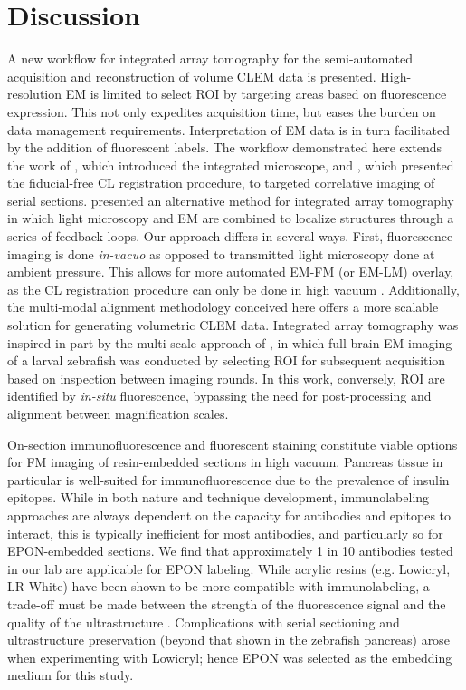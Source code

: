 \section{Discussion}
\label{sec:3.4_discussion}

A new workflow for integrated array tomography for the semi-automated acquisition and reconstruction of volume CLEM data is presented. High-resolution EM is limited to select ROI by targeting areas based on fluorescence expression. This not only expedites acquisition time, but eases the burden on data management requirements. Interpretation of EM data is in turn facilitated by the addition of fluorescent labels. The workflow demonstrated here extends the work of \textcite{liv2013simultaneous}, which introduced the integrated microscope, and \textcite{haring2017automated}, which presented the fiducial-free CL registration procedure, to targeted correlative imaging of serial sections. \textcite{gabarre2021workflow} presented an alternative method for integrated array tomography in which light microscopy and EM are combined to localize structures through a series of feedback loops. Our approach differs in several ways. First, fluorescence imaging is done \textit{in-vacuo} as opposed to transmitted light microscopy done at ambient pressure. This allows for more automated EM-FM (or EM-LM) overlay, as the CL registration procedure can only be done in high vacuum \cite{haring2017automated}. Additionally, the multi-modal alignment methodology conceived here offers a more scalable solution for generating volumetric CLEM data. Integrated array tomography was inspired in part by the multi-scale approach of \textcite{hildebrand2017whole}, in which full brain EM imaging of a larval zebrafish was conducted by selecting ROI for subsequent acquisition based on inspection between imaging rounds. In this work, conversely, ROI are identified by \textit{in-situ} fluorescence, bypassing the need for post-processing and alignment between magnification scales.

On-section immunofluorescence and fluorescent staining constitute viable options for FM imaging of resin-embedded sections in high vacuum. Pancreas tissue in particular is well-suited for immunofluorescence due to the prevalence of insulin epitopes. While in both nature and technique development, immunolabeling approaches are always dependent on the capacity for antibodies and epitopes to interact, this is typically inefficient for most antibodies, and particularly so for EPON-embedded sections. We find that approximately 1 in 10 antibodies tested in our lab are applicable for EPON labeling. While acrylic resins (e.g. Lowicryl, LR White) have been shown to be more compatible with immunolabeling, a trade-off must be made between the strength of the fluorescence signal and the quality of the ultrastructure \cite{watanabe2011protein, paez2015fixation}. Complications with serial sectioning and ultrastructure preservation (beyond that shown in the zebrafish pancreas) arose when experimenting with Lowicryl; hence EPON was selected as the embedding medium for this study.

